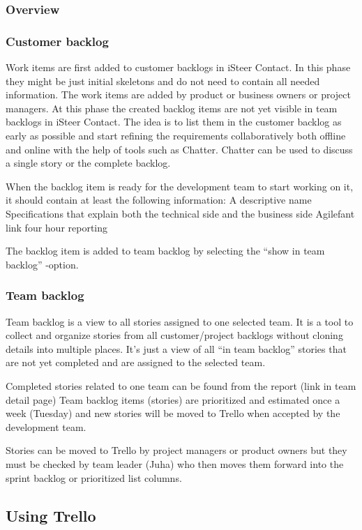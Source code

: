 \documentclass[english]{tktltiki2}
\theoremstyle{definition}
\theoremstyle{remark}
\begin{document}
\subsubsection{Overview}

\subsubsection{Customer backlog}
Work items are first added to customer backlogs in iSteer Contact. In this phase they might be just initial skeletons and do not need to contain all needed information. The work items are added by product or business owners or project managers. At this phase the created backlog items are not yet visible in team backlogs in iSteer Contact. The idea is to list them in the customer backlog as early as possible and start refining the requirements collaboratively both offline and online with the help of tools such as Chatter. Chatter can be used to discuss a single story or the complete backlog.

When the backlog item is ready for the development team to start working on it, it should contain at least the following information:
A descriptive name
Specifications that explain both the technical side and the business side
Agilefant link four hour reporting

The backlog item is added to team backlog by selecting the “show in team backlog” -option.

\subsubsection{Team backlog}
Team backlog is a view to all stories assigned to one selected team. It is a tool to collect and organize stories from all customer/project backlogs without cloning details into multiple places. It’s just a view of all “in team backlog” stories that are not yet completed and are assigned to the selected team.

Completed stories related to one team can be found from the report (link in team detail page)
Team backlog items (stories) are prioritized and estimated once a week (Tuesday) and new stories will be moved to Trello when accepted by the development team.

Stories can be moved to Trello by project managers or product owners but they must be checked by team leader (Juha) who then moves them forward into the sprint backlog or prioritized list columns.

\subsection{Using Trello}
\end{document}
